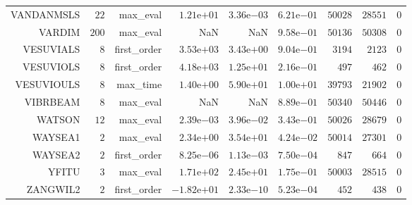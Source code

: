 \begin{longtable}{rrrrrrrrr}
VANDANMSLS & \(    22\) & max\_eval & \( 1.21\)e\(+01\) & \( 3.36\)e\(-03\) & \( 6.21\)e\(-01\) & \( 50028\) & \( 28551\) & \(     0\) \\
VARDIM & \(   200\) & max\_eval &       NaN &       NaN & \( 9.58\)e\(-01\) & \( 50136\) & \( 50308\) & \(     0\) \\
VESUVIALS & \(     8\) & first\_order & \( 3.53\)e\(+03\) & \( 3.43\)e\(+00\) & \( 9.04\)e\(-01\) & \(  3194\) & \(  2123\) & \(     0\) \\
VESUVIOLS & \(     8\) & first\_order & \( 4.18\)e\(+03\) & \( 1.25\)e\(+01\) & \( 2.16\)e\(-01\) & \(   497\) & \(   462\) & \(     0\) \\
VESUVIOULS & \(     8\) & max\_time & \( 1.40\)e\(+00\) & \( 5.90\)e\(+01\) & \( 1.00\)e\(+01\) & \( 39793\) & \( 21902\) & \(     0\) \\
VIBRBEAM & \(     8\) & max\_eval &       NaN &       NaN & \( 8.89\)e\(-01\) & \( 50340\) & \( 50446\) & \(     0\) \\
WATSON & \(    12\) & max\_eval & \( 2.39\)e\(-03\) & \( 3.96\)e\(-02\) & \( 3.43\)e\(-01\) & \( 50026\) & \( 28679\) & \(     0\) \\
WAYSEA1 & \(     2\) & max\_eval & \( 2.34\)e\(+00\) & \( 3.54\)e\(+01\) & \( 4.24\)e\(-02\) & \( 50014\) & \( 27301\) & \(     0\) \\
WAYSEA2 & \(     2\) & first\_order & \( 8.25\)e\(-06\) & \( 1.13\)e\(-03\) & \( 7.50\)e\(-04\) & \(   847\) & \(   664\) & \(     0\) \\
YFITU & \(     3\) & max\_eval & \( 1.71\)e\(+02\) & \( 2.45\)e\(+01\) & \( 1.75\)e\(-01\) & \( 50003\) & \( 28515\) & \(     0\) \\
ZANGWIL2 & \(     2\) & first\_order & \(-1.82\)e\(+01\) & \( 2.33\)e\(-10\) & \( 5.23\)e\(-04\) & \(   452\) & \(   438\) & \(     0\) \\\hline
\end{longtable}
